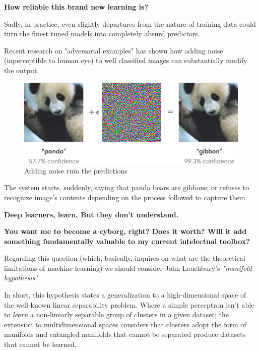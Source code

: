 \textcolor{primary}{
\textbf{How reliable this brand new learning is?}
}

Sadly, in practice, even slightly departures from the nature of training data could
turn the finest tuned models into completely absurd predictors.

Recent research on "adversarial examples"\cite{adversarial} has shown how adding 
noise (inperceptible to human eye) to well classified images can substantially modify 
the output.

\begin{figure}[h!]
	\includegraphics[width=\linewidth]{images/panda.png} %
	\caption{Adding noise ruin the predictions} %
	\label{bear} %
\end{figure}

The system starts, suddenly, saying that panda bears are gibbons; \cite{panda} or refuses to 
recognize image's contents depending on the process followed to capture them.

\textbf{Deep learners, learn. But they don't understand.}

\textcolor{primary}{
\textbf{You want me to become a cyborg, right? Does it worth? Will it add 
something fundamentally valuable to my current intelectual toolbox?}
}

Regarding this question (which, basically, inquires on what are the theoretical 
limitations of machine learning) we should consider John Lauchbury's \textit{
"manifold hypothesis"} \cite{darpa} 

In short, this hypothesis states a generalization to a high-dimensional space 
of the well-known linear separability problem. Where a simple perceptron isn't 
able to \textit{learn} a non-linearly separable group of clusters in a given 
dataset; the extension to multidimensional spaces considers that clusters adopt 
the form of manifolds and entangled manifolds that cannot be separated produce 
datasets that cannot be learned.

